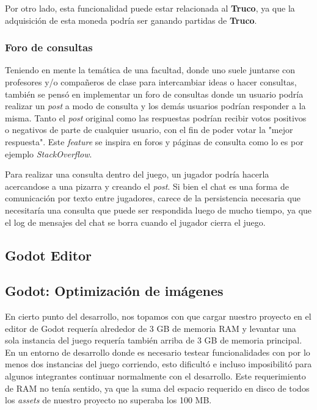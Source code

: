 Por otro lado, esta funcionalidad puede estar relacionada al \textbf{Truco}, ya que la adquisición de esta moneda
podría ser ganando partidas de \textbf{Truco}.

\subsubsection{Foro de consultas}
Teniendo en mente la temática de una facultad, donde uno suele juntarse con profesores y/o compañeros de clase
para intercambiar ideas o hacer consultas, también se pensó en implementar un foro de consultas donde un usuario
podría realizar un \textit{post} a modo de consulta y los demás usuarios podrían responder a la misma. Tanto el \textit{post}
original como las respuestas podrían recibir votos positivos o negativos de parte de cualquier usuario, con el fin
de poder votar la "mejor respuesta". Este \textit{feature} se inspira en foros y páginas de consulta como lo es por ejemplo
\textit{StackOverflow}.

Para realizar una consulta dentro del juego, un jugador podría hacerla acercandose a una pizarra y creando el \textit{post}.
Si bien el chat es una forma de comunicación por texto entre jugadores, carece de la persistencia necesaria que necesitaría
una consulta que puede ser respondida luego de mucho tiempo, ya que el log de mensajes del chat se borra cuando el jugador
cierra el juego.

\subsection{Godot Editor}

\subsection{Godot: Optimización de imágenes}

En cierto punto del desarrollo, nos topamos con que cargar nuestro proyecto en el editor de Godot
requería alrededor de 3 GB de memoria RAM y levantar una sola instancia del juego requería también
arriba de 3 GB de memoria principal. En un entorno de desarrollo donde es necesario testear
funcionalidades con por lo menos dos instancias del juego corriendo, esto dificultó e incluso
imposibilitó para algunos integrantes continuar normalmente con el desarrollo. Este requerimiento
de RAM no tenía sentido, ya que la suma del espacio requerido en disco de todos los 
\textit{assets} de nuestro proyecto no superaba los 100 MB.

